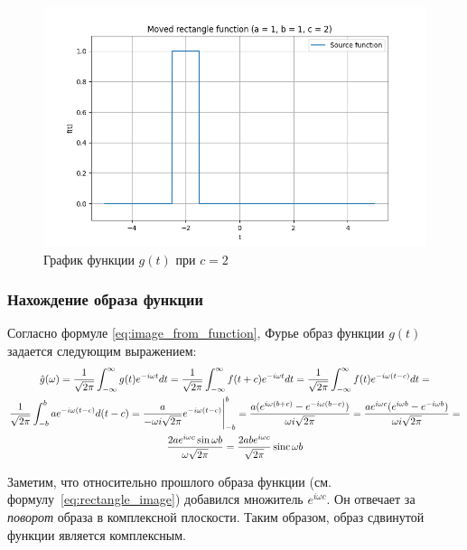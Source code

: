\begin{figure}[ht!]
    \centering
    \includegraphics[width=\textwidth]{media/moved_rectangle_3.png}
    \caption{График функции $g(t)$ при $c = 2$}
    \label{fig:moved_rectangle_3}
\end{figure}
\FloatBarrier

\subsubsection{Нахождение образа функции}

Согласно формуле \eqref{eq:image_from_function}, Фурье образ функции $g(t)$ задается следующим выражением:
\begin{multline}
    \hat{g}(\omega) = \frac{1}{\sqrt{2\pi}} \int_{-\infty}^{\infty} g(t) e^{-i\omega t} dt = \frac{1}{\sqrt{2\pi}} \int_{-\infty}^{\infty} f(t + c) e^{-i\omega t} dt = \frac{1}{\sqrt{2\pi}} \int_{-\infty}^{\infty} f(t) e^{-i\omega (t - c)} dt = \\
    \frac{1}{\sqrt{2\pi}} \int_{-b}^{b} a e^{-i\omega (t - c)} d(t - c) = \frac{a}{-\omega i\sqrt{2\pi}} e^{-i\omega (t - c)} \Biggr|_{-b}^{b} = \frac{a(e^{i\omega (b + c)} - e^{-i\omega (b - c)})}{\omega i \sqrt{2 \pi}} = \frac{a e^{i\omega c} (e^{i\omega b} - e^{-i\omega b})}{\omega i \sqrt{2\pi}} =\\
    \frac{2ae^{i\omega c} \sin{\omega b}}{\omega \sqrt{2\pi}} = \frac{2abe^{i\omega c}}{\sqrt{2\pi}}\operatorname{sinc}{\omega b}
    \label{eq:moved_rectangle_image}
\end{multline}

Заметим, что относительно прошлого образа функции (см. формулу~\eqref{eq:rectangle_image}) добавился множитель $e^{i\omega c}$. Он отвечает за \textit{поворот} образа в комплексной плоскости. Таким образом, образ сдвинутой функции является комплексным. 

